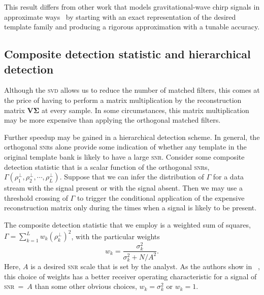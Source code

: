   This result differs from other work that models gravitational-wave chirp signals in approximate ways~\cite{Chassande-Mottin2006, Candes2008, BuonannoChenVallisneri:2003a} by starting with an exact representation of the desired template family and producing a rigorous approximation with a tunable accuracy.  

\subsection{Composite detection statistic and hierarchical detection}

Although the \textsc{svd} allows us to reduce the number of matched filters, this comes at the price of having to perform a matrix multiplication by the reconstruction matrix $\mathbf {V \Sigma}$ at every sample.  In some circumstances, this matrix multiplication may be more expensive than applying the orthogonal matched filters.

  Further speedup may be gained in a hierarchical detection scheme.  In general, the orthogonal \textsc{snr}s alone provide some indication of whether any template in the original template bank is likely to have a large \textsc{snr}.  Consider some composite detection statistic that is a scalar function of the orthogonal \textsc{snr}s, $\Gamma(\rho_1^\perp, \rho_2^\perp, \cdots, \rho_L^\perp)$.  Suppose that we can infer the distribution of $\Gamma$ for a data stream with the signal present or with the signal absent.  Then we may use a threshold crossing of $\Gamma$ to trigger the conditional application of the expensive reconstruction matrix only during the times when a signal is likely to be present.

The composite detection statistic that we employ is a weighted sum of squares, $\Gamma = \sum_{k=1}^L w_k (\rho_k^\perp) ^ 2$, with the particular weights
\begin{equation}
w_k = \frac{\sigma_k^2}{\sigma_k^2 + N / A^2}.
\end{equation}
Here, $A$ is a desired \textsc{snr} scale that is set by the analyst.  As the authors show in ~\cite{svd-compdetstat}, this choice of weights has a better receiver operating characteristic for a signal of \textsc{snr}~=~$A$ than some other obvious choices, $w_k = \sigma_k^2$ or $w_k = 1$.

